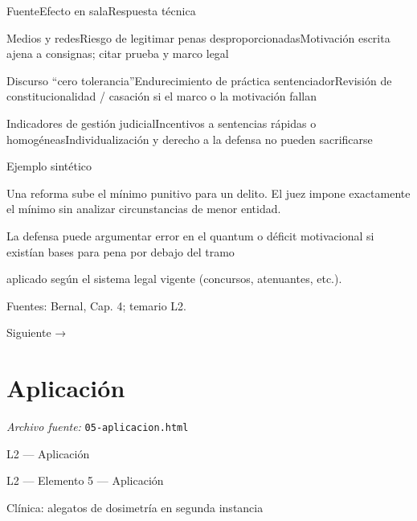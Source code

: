 \documentclass[11pt,a4paper]{article}
\begin{document}
          FuenteEfecto en salaRespuesta técnica\par




          Medios y redesRiesgo de legitimar penas desproporcionadasMotivación escrita ajena a consignas; citar prueba y marco legal\par

          Discurso “cero tolerancia”Endurecimiento de práctica sentenciadorRevisión de constitucionalidad / casación si el marco o la motivación fallan\par

          Indicadores de gestión judicialIncentivos a sentencias rápidas o homogéneasIndividualización y derecho a la defensa no pueden sacrificarse\par








      Ejemplo sintético\par


        Una reforma sube el mínimo punitivo para un delito. El juez impone exactamente el mínimo sin analizar circunstancias de menor entidad.\par
        La defensa puede argumentar error en el quantum o déficit motivacional si existían bases para pena por debajo del tramo\par
        aplicado según el sistema legal vigente (concursos, atenuantes, etc.).\par





      Fuentes: Bernal, Cap. 4; temario L2.\par


    Siguiente →\par

\section{Aplicaci\'on}
\noindent\textit{Archivo fuente:} \texttt{05-aplicacion.html}

L2 — Aplicación\par





    L2 — Elemento 5 — Aplicación\par
    Clínica: alegatos de dosimetría en segunda instancia\par
\end{document}
